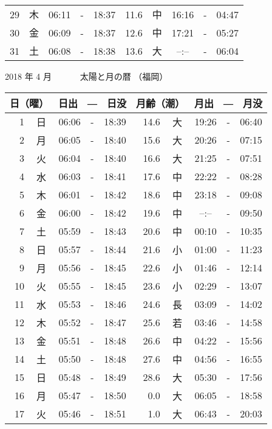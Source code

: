 \documentclass[a4j,10pt]{jsarticle}
\begin{document}
\begin{center}
\begin{table}[ht]
\begin{center}
\begin{tabular}{|rc|ccc|rc|ccc|}
 29 & 木 & 06:11 &-& 18:37 & 11.6 & 中 & 16:16 &-& 04:47 \\
 30 & 金 & 06:09 &-& 18:37 & 12.6 & 中 & 17:21 &-& 05:27 \\
 31 & 土 & 06:08 &-& 18:38 & 13.6 & 大 &  --:--  &-& 06:04 \\
    \hline
    \end{tabular}
    \end{center}
\end{table}
\newpage
  {\large 2018 年  4 月}
  {\Large 　　　太陽と月の暦   （福岡） }
  \begin{table}[ht]
  \begin{center}
     \begin{tabular}{|rc|ccc|rc|ccc|}
     \hline
     \multicolumn{2}{|c|}{日（曜）} & \multicolumn{3}{c|}{日出　―　日没} & \multicolumn{2}{c|}{月齢（潮）} & \multicolumn{3}{c|}{月出　―　月没}\\
     \hline
  1 & 日 & 06:06 &-& 18:39 & 14.6 & 大 & 19:26 &-& 06:40 \\
  2 & 月 & 06:05 &-& 18:40 & 15.6 & 大 & 20:26 &-& 07:15 \\
  3 & 火 & 06:04 &-& 18:40 & 16.6 & 大 & 21:25 &-& 07:51 \\
  4 & 水 & 06:03 &-& 18:41 & 17.6 & 中 & 22:22 &-& 08:28 \\
  5 & 木 & 06:01 &-& 18:42 & 18.6 & 中 & 23:18 &-& 09:08 \\
  6 & 金 & 06:00 &-& 18:42 & 19.6 & 中 &  --:--  &-& 09:50 \\
  7 & 土 & 05:59 &-& 18:43 & 20.6 & 中 & 00:10 &-& 10:35 \\
  8 & 日 & 05:57 &-& 18:44 & 21.6 & 小 & 01:00 &-& 11:23 \\
  9 & 月 & 05:56 &-& 18:45 & 22.6 & 小 & 01:46 &-& 12:14 \\
 10 & 火 & 05:55 &-& 18:45 & 23.6 & 小 & 02:29 &-& 13:07 \\
 11 & 水 & 05:53 &-& 18:46 & 24.6 & 長 & 03:09 &-& 14:02 \\
 12 & 木 & 05:52 &-& 18:47 & 25.6 & 若 & 03:46 &-& 14:58 \\
 13 & 金 & 05:51 &-& 18:48 & 26.6 & 中 & 04:22 &-& 15:56 \\
 14 & 土 & 05:50 &-& 18:48 & 27.6 & 中 & 04:56 &-& 16:55 \\
 15 & 日 & 05:48 &-& 18:49 & 28.6 & 大 & 05:30 &-& 17:56 \\
 16 & 月 & 05:47 &-& 18:50 &  0.0 & 大 & 06:05 &-& 18:58 \\
 17 & 火 & 05:46 &-& 18:51 &  1.0 & 大 & 06:43 &-& 20:03 \\

\end{tabular}
\end{center}
\end{table}
\end{center}
\end{document}
